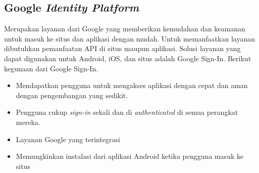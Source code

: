 \subsection{Google \textit{Identity Platform}}
\label{subsec:googleidentityplatform}
\hspace{0,5cm} Merupakan layanan dari Google yang memberikan kemudahan dan keamanan  untuk masuk ke situs dan aplikasi dengan mudah. Untuk memanfaatkan layanan dibutuhkan pemanfaatan API di situs maupun aplikasi. Solusi layanan yang dapat digunakan untuk Android, iOS, dan situs adalah Google Sign-In. Berikut kegunaan dari Google Sign-In.
\begin{itemize}
	\item Mendapatkan pengguna untuk mengakses aplikasi dengan cepat dan aman dengan pengembangan yang sedikit. 
	\item Pengguna cukup \textit{sign-in} sekali dan di \textit{authenticated} di semua perangkat mereka.
	\item Layanan Google yang terintegrasi
	\item Memungkinkan instalasi dari aplikasi Android ketika pengguna masuk ke situs
\end{itemize}
   
